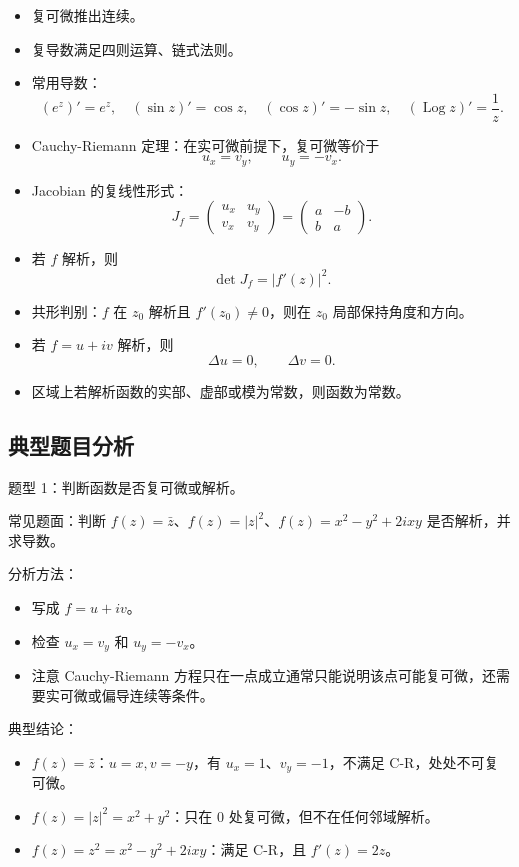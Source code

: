 \documentclass{article}
\DeclareMathOperator{\Log}{Log}
\begin{document}
\begin{itemize}
\item
  复可微推出连续。
\item
  复导数满足四则运算、链式法则。
\item
  常用导数： \[
  (e^z)'=e^z,\quad (\sin z)'=\cos z,\quad (\cos z)'=-\sin z,\quad (\Log z)'=\frac1z.
  \]
\item
  Cauchy-Riemann 定理：在实可微前提下，复可微等价于 \[
  u_x=v_y,\qquad u_y=-v_x.
  \]
\item
  Jacobian 的复线性形式： \[
  J_f=
  \begin{pmatrix}
  u_x&u_y\\
  v_x&v_y
  \end{pmatrix}
  =
  \begin{pmatrix}
  a&-b\\
  b&a
  \end{pmatrix}.
  \]
\item
  若 $f$ 解析，则 \[
  \det J_f=|f'(z)|^2.
  \]
\item
  共形判别：$f$ 在 $z_0$ 解析且 $f'(z_0)\ne 0$，则在
  $z_0$ 局部保持角度和方向。
\item
  若 $f=u+iv$ 解析，则 \[
  \Delta u=0,\qquad \Delta v=0.
  \]
\item
  区域上若解析函数的实部、虚部或模为常数，则函数为常数。
\end{itemize}

\subsection{典型题目分析}

题型 1：判断函数是否复可微或解析。

常见题面：判断
 \(f(z)=\bar z\)、\(f(z)=|z|^2\)、\(f(z)=x^2-y^2+2ixy\)
是否解析，并求导数。

分析方法：

\begin{itemize}
\item
  写成 $f=u+iv$。
\item
  检查 $u_x=v_y$ 和 $u_y=-v_x$。
\item
  注意 Cauchy-Riemann
  方程只在一点成立通常只能说明该点可能复可微，还需要实可微或偏导连续等条件。
\end{itemize}

典型结论：

\begin{itemize}
\item
  \(f(z)=\bar z\)：\(u=x,v=-y\)，有
  \(u_x=1\)、\(v_y=-1\)，不满足 C-R，处处不可复可微。
\item
  \(f(z)=|z|^2=x^2+y^2\)：只在
  \(0\) 处复可微，但不在任何邻域解析。
\item
  \(f(z)=z^2=x^2-y^2+2ixy\)：满足 C-R，且
  \(f'(z)=2z\)。
\end{itemize}
\end{document}
